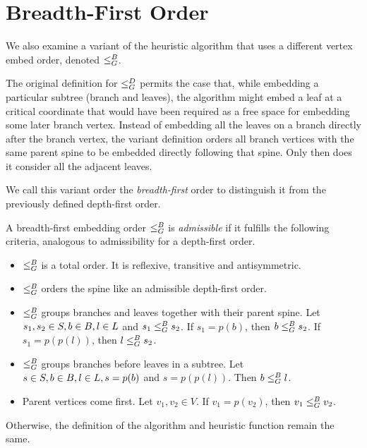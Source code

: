 \section{Breadth-First Order}
\label{section:ch5-bfs}

We also examine a variant of the heuristic algorithm that uses a different vertex embed order, denoted $\leq_G^B$.

The original definition for $\leq_G^D$ permits the case that, while embedding a particular subtree (branch and leaves), the algorithm might embed a leaf at a critical coordinate that would have been required as a free space for embedding some later branch vertex. Instead of embedding all the leaves on a branch directly after the branch vertex, the variant definition orders all branch vertices with the same parent spine to be embedded directly following that spine. Only then does it consider all the adjacent leaves.

We call this variant order the \emph{breadth-first} order to distinguish it from the previously defined depth-first order.

A breadth-first embedding order $\leq_G^B$ is \emph{admissible} if it fulfills the following criteria, analogous to admissibility for a depth-first order.

\begin{itemize}
    \item $\leq_G^B$ is a total order. It is reflexive, transitive and antisymmetric.
    \item $\leq_G^B$ orders the spine like an admissible depth-first order.
    \item $\leq_G^B$ groups branches and leaves together with their parent spine. 
     Let $s_1, s_2 \in S, b \in B, l \in L$ and $s_1 \leq_G^B s_2$. If $s_1 = p(b)$, then $b \leq_G^B s_2$. If $s_1 = p(p(l))$, then $l \leq_G^B s_2$.
    \item $\leq_G^B$ groups branches before leaves in a subtree. Let $s \in S, b \in B, l \in L, s = p(b)$ and $s = p(p(l))$. Then $b \leq_G^B l$.
    \item Parent vertices come first. Let $v_1, v_2 \in V$. If $v_1 = p(v_2)$, then $v_1 \leq_G^B v_2$.
\end{itemize}

Otherwise, the definition of the algorithm and heuristic function remain the same.
